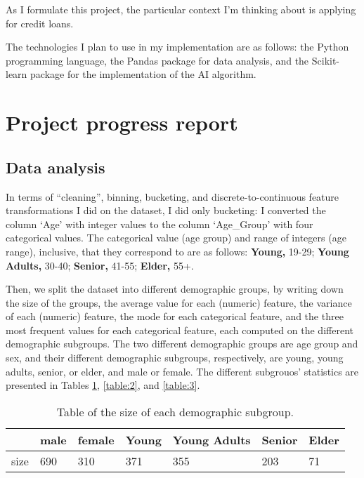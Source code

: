 \documentclass[conference]{IEEEtran}
\begin{document}
As I formulate this project, the particular context I'm thinking about is applying for credit loans.

The technologies I plan to use in my implementation are as follows: the Python programming language, the Pandas package for data analysis, and the Scikit-learn package for the implementation of the AI algorithm.
\newpage 

\section{Project progress report}
\subsection{Data analysis}
In terms of ``cleaning'', binning, bucketing, and discrete-to-continuous feature transformations I did on the dataset, I did only bucketing: I converted the column `Age' with integer values to the column `Age\_Group' with four categorical values. The categorical value (age group) and range of integers (age range), inclusive, that they correspond to are as follows: \textbf{Young,} 19-29; \textbf{Young Adults,} 30-40; \textbf{Senior,} 41-55; \textbf{Elder,} 55+.

Then, we split the dataset into different demographic groups, by writing down the size of the groups, the average value for each (numeric) feature, the variance of each (numeric) feature, the mode for each categorical feature, and the three most frequent values for each categorical feature, each computed on the different demographic subgroups. The two different demographic groups are age group and sex, and their different demographic subgroups, respectively, are young, young adults, senior, or elder, and male or female. The different subgrouos' statistics are presented in Tables \ref{table:1}, \ref{table:2}, and \ref{table:3}.

\begin{table}[h]
\begin{center}
\caption{Table of the size of each demographic subgroup.}
\begin{tabularx}{0.49\textwidth} { |X|X|X|X|X|X|X| } 
    \hline
            & male & female & Young & Young Adults & Senior & Elder \\ 
        \hline
        size & 690  & 310    & 371   & 355          & 203    & 71    \\
        \hline
\end{tabularx}
\label{table:1}
\end{center}
\end{table}
\end{document}
